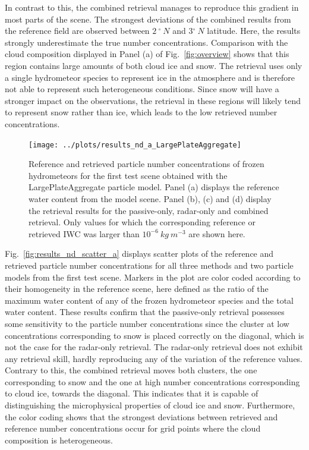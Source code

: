 \documentclass[journal abbreviation, manuscript]{copernicus}
\begin{document}
In contrast to this, the combined retrieval manages to reproduce this gradient
in most parts of the scene. The strongest deviations of the combined results
from the reference field are observed between $2\ \unit{^\circ \ N}$ and
$3\unit{^\circ \ N}$ latitude. Here, the results strongly underestimate the true
number concentrations. Comparison with the cloud composition displayed in Panel
(a) of Fig.~\ref{fig:overview} shows that this region contains large amounts of
both cloud ice and snow. The retrieval uses only a single hydrometeor species to
represent ice in the atmosphere and is therefore not able to represent such
heterogeneous conditions. Since snow will have a stronger impact on the
observations, the retrieval in these regions will likely tend to represent snow
rather than ice, which leads to the low retrieved number concentrations.

\begin{figure}
\centering
\texttt{[image: ../plots/results\_nd\_a\_LargePlateAggregate]}
\caption{Reference and retrieved particle number concentrations of frozen
  hydrometeors for the first test scene obtained with the LargePlateAggregate
  particle model. Panel (a) displays the reference water content from the
  model scene. Panel (b), (c) and (d) display the retrieval results for the
  passive-only, radar-only and combined retrieval. Only values for which the
  corresponding reference or retrieved IWC was larger than
  $10^{-6}\ \unit{kg\ m^{-3}}$ are shown here.}
\label{fig:results_nd_a}
\end{figure}

Fig.~\ref{fig:results_nd_scatter_a} displays scatter plots of the reference and
retrieved particle number concentrations for all three methods and two particle
models from the first test scene. Markers in the plot are color coded according
to their homogeneity in the reference scene, here defined as the ratio of the
maximum water content of any of the frozen hydrometeor species and the total
water content. These results confirm that the passive-only retrieval possesses
some sensitivity to the particle number concentrations since the cluster at low
concentrations corresponding to snow is placed correctly on the diagonal, which
is not the case for the radar-only retrieval. The radar-only retrieval does not
exhibit any retrieval skill, hardly reproducing any of the variation of the
reference values. Contrary to this, the combined retrieval moves both clusters,
the one corresponding to snow and the one at high number concentrations
corresponding to cloud ice, towards the diagonal. This indicates that it is
capable of distinguishing the microphysical properties of cloud ice and snow.
Furthermore, the color coding shows that the strongest deviations between
retrieved and reference number concentrations occur for grid points where the
cloud composition is heterogeneous.
\end{document}
